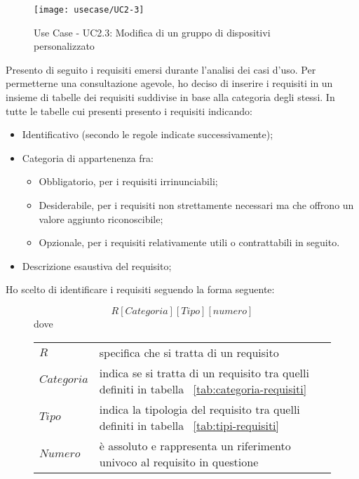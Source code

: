 \begin{figure}[!h]
    \centering
    \texttt{[image: usecase/UC2-3]}
    \caption{Use Case - UC2.3: Modifica di un gruppo di dispositivi personalizzato}
    \label{fig:uc2.3}
\end{figure}
\newpage

Presento di seguito i requisiti emersi durante l’analisi dei casi d’uso.
Per permetterne una consultazione agevole, ho deciso di inserire i requisiti in un insieme di tabelle dei requisiti suddivise in base alla categoria degli stessi.
In tutte le tabelle cui presenti presento i requisiti indicando:
\begin{itemize}
	\item Identificativo (secondo le regole indicate successivamente);
	\item Categoria di appartenenza fra:
	\begin{itemize}
		\item Obbligatorio, per i requisiti irrinunciabili;
		\item Desiderabile, per i requisiti non strettamente necessari ma che offrono un
    valore aggiunto riconoscibile;
		\item Opzionale, per i requisiti relativamente utili o contrattabili in seguito.
	\end{itemize}
	\item Descrizione esaustiva del requisito;
\end{itemize}

\newenvironment{conditions}
  {\par\vspace{\abovedisplayskip}\noindent\begin{tabular}{>{$}l<{$} @{${}={}$} l}}
  {\end{tabular}\par\vspace{\belowdisplayskip}}

Ho scelto di identificare i requisiti seguendo la forma seguente:

\begin{figure}[H]
  \centering
  \[ R[Categoria][Tipo][numero] \]
	dove
	\begin{conditions}
    R & specifica che si tratta di un requisito\\
    Categoria & indica se si tratta di un requisito tra quelli definiti in tabella ~\ref{tab:categoria-requisiti}\\
    Tipo & indica la tipologia del requisito tra quelli definiti in tabella ~\ref{tab:tipi-requisiti}\\
		Numero & è assoluto e rappresenta un riferimento univoco al requisito in questione\\
	\end{conditions}
\end{figure}

